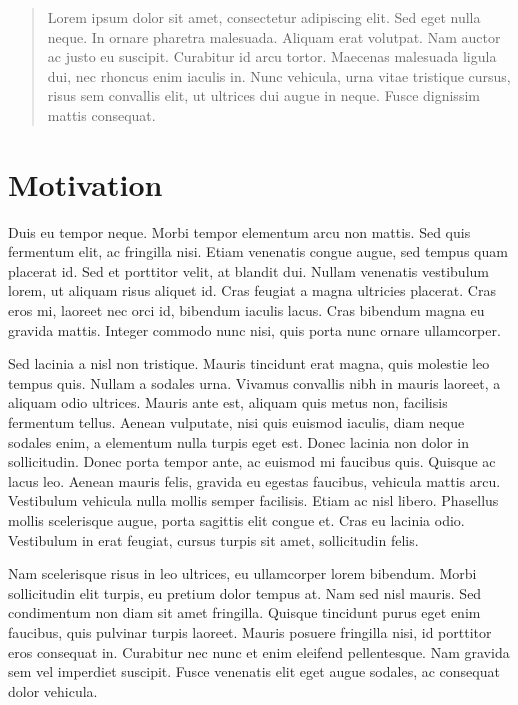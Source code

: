 \documentclass{article}
\begin{document}

\begin{abstract}
Lorem ipsum dolor sit amet, consectetur adipiscing elit. Sed eget nulla neque. In ornare pharetra malesuada. Aliquam erat volutpat. Nam auctor ac justo eu suscipit. Curabitur id arcu tortor. Maecenas malesuada ligula dui, nec rhoncus enim iaculis in. Nunc vehicula, urna vitae tristique cursus, risus sem convallis elit, ut ultrices dui augue in neque. Fusce dignissim mattis consequat.
\end{abstract}

\section{Motivation}

Duis eu tempor neque. Morbi tempor elementum arcu non mattis. Sed quis fermentum elit, ac fringilla nisi. Etiam venenatis congue augue, sed tempus quam placerat id. Sed et porttitor velit, at blandit dui. Nullam venenatis vestibulum lorem, ut aliquam risus aliquet id. Cras feugiat a magna ultricies placerat. Cras eros mi, laoreet nec orci id, bibendum iaculis lacus. Cras bibendum magna eu gravida mattis. Integer commodo nunc nisi, quis porta nunc ornare ullamcorper.

Sed lacinia a nisl non tristique. Mauris tincidunt erat magna, quis molestie leo tempus quis. Nullam a sodales urna. Vivamus convallis nibh in mauris laoreet, a aliquam odio ultrices. Mauris ante est, aliquam quis metus non, facilisis fermentum tellus. Aenean vulputate, nisi quis euismod iaculis, diam neque sodales enim, a elementum nulla turpis eget est. Donec lacinia non dolor in sollicitudin. Donec porta tempor ante, ac euismod mi faucibus quis. Quisque ac lacus leo. Aenean mauris felis, gravida eu egestas faucibus, vehicula mattis arcu. Vestibulum vehicula nulla mollis semper facilisis. Etiam ac nisl libero. Phasellus mollis scelerisque augue, porta sagittis elit congue et. Cras eu lacinia odio. Vestibulum in erat feugiat, cursus turpis sit amet, sollicitudin felis.

Nam scelerisque risus in leo ultrices, eu ullamcorper lorem bibendum. Morbi sollicitudin elit turpis, eu pretium dolor tempus at. Nam sed nisl mauris. Sed condimentum non diam sit amet fringilla. Quisque tincidunt purus eget enim faucibus, quis pulvinar turpis laoreet. Mauris posuere fringilla nisi, id porttitor eros consequat in. Curabitur nec nunc et enim eleifend pellentesque. Nam gravida sem vel imperdiet suscipit. Fusce venenatis elit eget augue sodales, ac consequat dolor vehicula.
\end{document}
